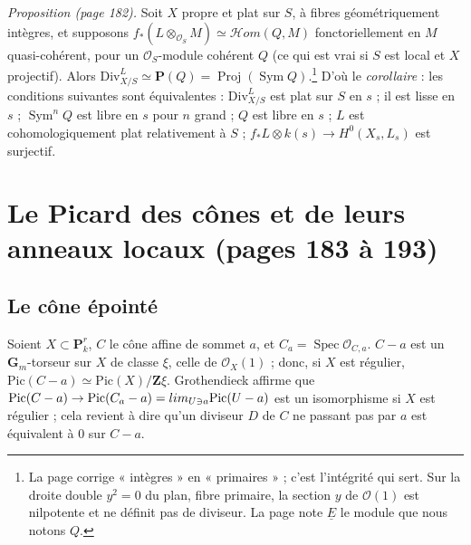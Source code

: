 \documentclass[11pt,a4paper]{article}
\begin{document}
\emph{Proposition (page 182).} Soit $X$ propre et plat sur $S$, à fibres
géométriquement intègres, et supposons
$f_*(L \otimes_{\mathcal{O}_S} M) \simeq \mathcal{H}om(Q, M)$ fonctoriellement
en $M$ quasi-cohérent, pour un $\mathcal{O}_S$-module cohérent $Q$ (ce qui est
vrai si $S$ est local et $X$ projectif). Alors
$\mathrm{Div}^L_{X/S} \simeq \mathbf{P}(Q) = \operatorname{Proj}(\operatorname{Sym} Q)$.\footnote{La
page corrige « intègres » en « primaires » ; c'est l'intégrité qui sert. Sur la
droite double $y^2 = 0$ du plan, fibre primaire, la section $y$ de
$\mathcal{O}(1)$ est nilpotente et ne définit pas de diviseur. La page note
$\underline{E}$ le module que nous notons $Q$.} D'où le \emph{corollaire} :
les conditions suivantes sont équivalentes : $\mathrm{Div}^L_{X/S}$ est plat
sur $S$ en $s$ ; il est lisse en $s$ ; $\operatorname{Sym}^n Q$ est libre en $s$
pour $n$ grand ; $Q$ est libre en $s$ ; $L$ est cohomologiquement plat
relativement à $S$ ; $f_*L \otimes k(s) \to H^0(X_s, L_s)$ est surjectif.

\section*{Le Picard des cônes et de leurs anneaux locaux (pages 183 à 193)}

\subsection*{Le cône épointé}

Soient $X \subset \mathbf{P}^r_k$, $C$ le cône affine de sommet $a$, et
$C_a = \operatorname{Spec}\mathcal{O}_{C,a}$. $C - a$ est un
$\mathbf{G}_m$-torseur sur $X$ de classe $\xi$, celle de $\mathcal{O}_X(1)$ ;
donc, si $X$ est régulier,
$\mathrm{Pic}(C - a) \simeq \mathrm{Pic}(X)/\mathbf{Z}\xi$. Grothendieck
affirme que $\mathrm{Pic}(C - a) \to \mathrm{Pic}(C_a - a) = \varinjlim_{U \ni a}\mathrm{Pic}(U - a)$
est un isomorphisme si $X$ est régulier ; cela revient à dire qu'un diviseur
$D$ de $C$ ne passant pas par $a$ est équivalent à $0$ sur $C - a$.
\end{document}
